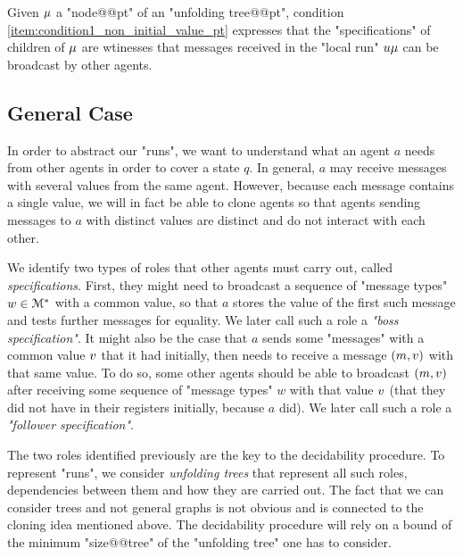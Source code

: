 Given $\mu$ a "node@@pt" of an "unfolding tree@@pt", condition \ref{item:condition1_non_initial_value_pt} expresses that the "specifications" of children of $\mu$ are wtinesses that messages received in the "local run" $u{\mu}$ can be broadcast by other agents. 














\subsection{General Case}
In order to abstract our "runs", we want to understand what an agent $a$ needs from other agents in order to cover a state $q$. 
In general, $a$ may receive messages with several values from the same agent. However, because each message contains a single value, we will in fact be able to clone agents so that agents sending messages to $a$ with distinct values are distinct and do not interact with each other. 

We identify two types of roles that other agents must carry out, called \emph{specifications}. First, they might need to broadcast a sequence of "message types" $w \in \mathcal{M}^*$ with a common value, so that $a$ stores the value of the first such message and tests further messages for equality. We later call such a role a \emph{"boss specification"}.  
It might also be the case that $a$ sends some "messages" with a common value $v$ that it had initially, then needs to receive a message $(m, v)$ with that same value. To do so, some other agents should be able to  broadcast $(m, v)$ after receiving some sequence of "message types" $w$ with that value $v$ (that they did not have in their registers initially, because $a$ did). We later call such a role a \emph{"follower specification"}.

The two roles identified previously are the key to the decidability procedure.
To represent "runs", we consider \emph{unfolding trees} that represent all such roles, dependencies between them and how they are carried out. The fact that we can consider trees and not general graphs is not obvious and is connected to the cloning idea mentioned above.  The decidability procedure will rely on a bound of the minimum "size@@tree" of the "unfolding tree" one has to consider.

